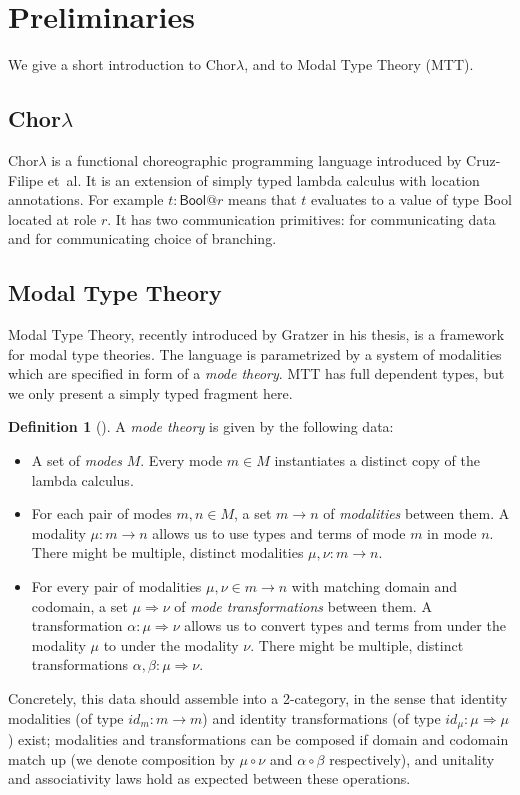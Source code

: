 \documentclass{scrartcl}
\theoremstyle{definition}
\newtheorem{definition}{Definition}
\theoremstyle{plain}
\begin{document}
\section{Preliminaries}
We give a short introduction to Chor$\lambda$, and to Modal Type Theory (MTT).

\subsection{Chor$\lambda$}
Chor$\lambda$\cite{cruz2022functional} is a functional choreographic programming language introduced by
Cruz-Filipe et~al. It is an extension of simply typed lambda calculus with
location annotations. For example $t :
\textsf{Bool} @ r$ means that $t$ evaluates to a value of type \textsf{Bool}
located at role $r$. It has two communication primitives:  for
communicating data and  for communicating choice of branching.

\subsection{Modal Type Theory}
Modal Type Theory\cite{gratzer2023syntax}, recently introduced by Gratzer in his
thesis, is a framework for modal type theories. The
language is parametrized by a system of modalities which are specified in form
of a \textit{mode theory}.
MTT has full dependent types, but we only present a simply typed fragment here.%
\begin{definition}[{\cite[Chapter 6.1.1]{gratzer2023syntax}}]
  A \textit{mode theory} is given by the following data:
  \begin{itemize}
  \item A set of \textit{modes} $M$. Every mode $m \in M$ instantiates a
    distinct copy of the lambda calculus.
    \item For each pair of modes $m, n \in M$, a set $m \to n$ of \textit{modalities}
      between them. A modality $\mu : m \to n$ allows us to use types and terms
      of mode $m$ in mode $n$. There might be multiple, distinct modalities $\mu , \nu : m
      \to n$.
    \item For every pair of modalities $\mu, \nu \in m \to n$ with matching domain
      and codomain, a set $\mu \Rightarrow \nu$ of \textit{mode transformations} between them.
      A transformation $\alpha : \mu \Rightarrow \nu$ allows us to convert
      types and terms from under the modality $\mu$ to under the modality $\nu$.
      There might be multiple, distinct transformations $\alpha, \beta : \mu
      \Rightarrow \nu$.
  \end{itemize}
  Concretely, this data should assemble into a 2-category, in the sense that
  identity modalities (of type $id_m : m \to m$) and identity transformations (of
  type $id_\mu : \mu \Rightarrow \mu $) exist; modalities and transformations can
  be composed if domain and codomain match up (we denote composition by $\mu \circ
  \nu$ and $\alpha \circ \beta$ respectively), and unitality and associativity
  laws hold as expected between these operations\cite{licata2016adjoint}.
\end{definition}%
\end{document}
